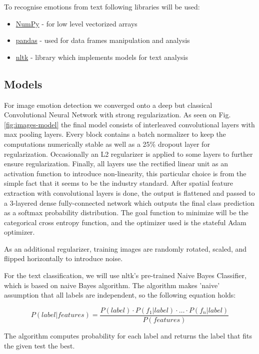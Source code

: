 \documentclass{ledger}
\begin{document}
To recognise emotions from text following libraries will be used:
\begin{itemize}
	\item{} \href{https://numpy.org}{NumPy} - for low level vectorized arrays
	\item{} \href{https://pandas.pydata.org}{pandas} - used for data frames manipulation and analysis
	\item{} \href{https://www.nltk.org/}{nltk} - library which implements models for text analysis

\end{itemize}

\subsection{Models}

For image emotion detection we converged onto a deep but classical Convolutional Neural Network with strong regularization. As seen on Fig. \ref{fig:images-model} the final model consists of interleaved convolutional layers with max pooling layers. Every block contains a batch normalizer to keep the computations numerically stable as well as a 25\% dropout layer for regularization. Occasionally an L2 regularizer is applied to some layers to further ensure regularization. Finally, all layers use the rectified linear unit as an activation function to introduce non-linearity, this particular choice is from the simple fact that it seems to be the industry standard. After spatial feature extraction with convolutional layers is done, the output is flattened and passed to a 3-layered dense fully-connected network which outputs the final class prediction as a softmax probability distribution. The goal function to minimize will be the categorical cross entropy function, and the optimizer used is the stateful Adam optimizer.

As an additional regularizer, training images are randomly rotated, scaled, and flipped horizontally to introduce noise.


\hfill

For the text classification, we will use nltk's pre-trained Naive Bayes Classifier, which is based on naive Bayes algorithm. The algorithm makes 'naive' assumption that all labels are independent, so the following equation holds:

\[P(label|features) = \frac{P(label)\cdot P(f_1|label) \cdot \ldots \cdot P(f_n|label)}{P(features)}\]

The algorithm computes probability for each label and returns the label that fits the given test the best.
\end{document}
